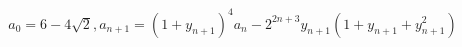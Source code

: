 \documentclass[preview]{standalone}
\begin{document}
\begin{align*}
a_0 = 6-4\sqrt{2}, a_{n+1} = (1+y_{n+1})^4 a_n - 2^{2n+3} y_{n+1} (1+y_{n+1}+y_{n+1}^2)
\end{align*}
\end{document}
